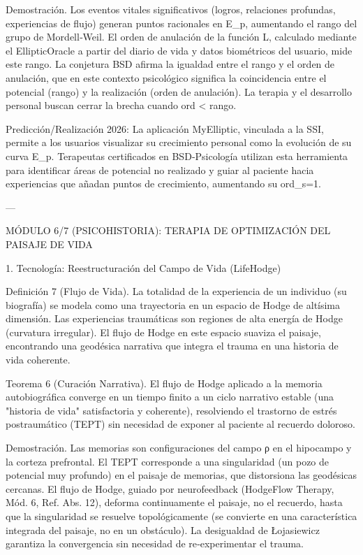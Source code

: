 \documentclass[12pt,twoside]{book}
\begin{document}
Demostración. Los eventos vitales significativos (logros, relaciones profundas, experiencias de flujo) generan puntos racionales en E_p, aumentando el rango del grupo de Mordell‑Weil. El orden de anulación de la función L, calculado mediante el EllipticOracle a partir del diario de vida y datos biométricos del usuario, mide este rango. La conjetura BSD afirma la igualdad entre el rango y el orden de anulación, que en este contexto psicológico significa la coincidencia entre el potencial (rango) y la realización (orden de anulación). La terapia y el desarrollo personal buscan cerrar la brecha cuando ord < rango.

Predicción/Realización 2026: La aplicación MyElliptic, vinculada a la SSI, permite a los usuarios visualizar su crecimiento personal como la evolución de su curva E_p. Terapeutas certificados en BSD‑Psicología utilizan esta herramienta para identificar áreas de potencial no realizado y guiar al paciente hacia experiencias que añadan puntos de crecimiento, aumentando su ord_{s=1}.

---

MÓDULO 6/7 (PSICOHISTORIA): TERAPIA DE OPTIMIZACIÓN DEL PAISAJE DE VIDA

1. Tecnología: Reestructuración del Campo de Vida (LifeHodge)

Definición 7 (Flujo de Vida). La totalidad de la experiencia de un individuo (su biografía) se modela como una trayectoria en un espacio de Hodge de altísima dimensión. Las experiencias traumáticas son regiones de alta energía de Hodge (curvatura irregular). El flujo de Hodge en este espacio suaviza el paisaje, encontrando una geodésica narrativa que integra el trauma en una historia de vida coherente.

Teorema 6 (Curación Narrativa). El flujo de Hodge aplicado a la memoria autobiográfica converge en un tiempo finito a un ciclo narrativo estable (una "historia de vida" satisfactoria y coherente), resolviendo el trastorno de estrés postraumático (TEPT) sin necesidad de exponer al paciente al recuerdo doloroso.

Demostración. Las memorias son configuraciones del campo ρ en el hipocampo y la corteza prefrontal. El TEPT corresponde a una singularidad (un pozo de potencial muy profundo) en el paisaje de memorias, que distorsiona las geodésicas cercanas. El flujo de Hodge, guiado por neurofeedback (HodgeFlow Therapy, Mód. 6, Ref. Abs. 12), deforma continuamente el paisaje, no el recuerdo, hasta que la singularidad se resuelve topológicamente (se convierte en una característica integrada del paisaje, no en un obstáculo). La desigualdad de Łojasiewicz garantiza la convergencia sin necesidad de re‑experimentar el trauma.
\end{document}
